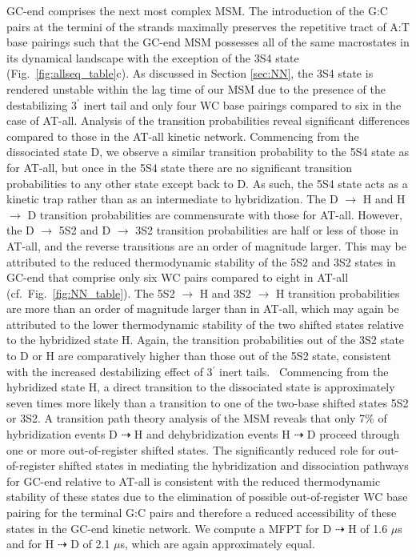 \documentclass[journal=jpcbfk,manuscript=article]{achemso}
\begin{document}
GC-end comprises the next most complex MSM. The introduction of the G:C pairs at the termini of the strands maximally preserves the repetitive tract of A:T base pairings such that the GC-end MSM possesses all of the same macrostates in its dynamical landscape with the exception of the 3S4 state (Fig.~\ref{fig:allseq_table}c). As discussed in Section \ref{sec:NN}, the 3S4 state is rendered unstable within the lag time of our MSM due to the presence of the destabilizing 3$^\prime$ inert tail and only four WC base pairings compared to six in the case of AT-all. Analysis of the transition probabilities reveal significant differences compared to those in the AT-all kinetic network. Commencing from the dissociated state D, we observe a similar transition probability to the 5S4 state as for AT-all, but once in the 5S4 state there are no significant transition probabilities to any other state except back to D. As such, the 5S4 state acts as a kinetic trap rather than as an intermediate to hybridization. The D $\rightarrow$ H and H $\rightarrow$ D transition probabilities are commensurate with those for AT-all. However, the D $\rightarrow$ 5S2 and D $\rightarrow$ 3S2 transition probabilities are half or less of those in AT-all, and the reverse transitions are an order of magnitude larger. This may be attributed to the reduced thermodynamic stability of the 5S2 and 3S2 states in GC-end that comprise only six WC pairs compared to eight in AT-all (cf.\ Fig.~\ref{fig:NN_table}). The 5S2 $\rightarrow$ H and 3S2 $\rightarrow$ H transition probabilities are more than an order of magnitude larger than in AT-all, which may again be attributed to the lower thermodynamic stability of the two shifted states relative to the hybridized state H. Again, the transition probabilities out of the 3S2 state to D or H are comparatively higher than those out of the 5S2 state, consistent with the increased destabilizing effect of 3$^\prime$ inert tails.~\citep{Doktycz1990ThermodynamicC, Dickman2012ThermodynamicDNAs, DiMichele2014EffectHybridization} Commencing from the hybridized state H, a direct transition to the dissociated state is approximately seven times more likely than a transition to one of the two-base shifted states 5S2 or 3S2. A transition path theory analysis of the MSM reveals that only 7\% of hybridization events D $\dashrightarrow$ H and dehybridization events H $\dashrightarrow$ D proceed through one or more out-of-register shifted states. The significantly reduced role for out-of-register shifted states in mediating the hybridization and dissociation pathways for GC-end relative to AT-all is consistent with the reduced thermodynamic stability of these states due to the elimination of possible out-of-register WC base pairing for the terminal G:C pairs and therefore a reduced accessibility of these states in the GC-end kinetic network. We compute a MFPT for D $\dashrightarrow$ H of 1.6 $\mu$s and for H $\dashrightarrow$ D of 2.1 $\mu$s, which are again approximately equal.
\end{document}
